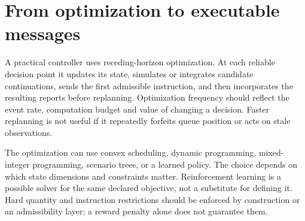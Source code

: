 \documentclass[11pt]{article}
\numberwithin{equation}{section}
\theoremstyle{definition}
\theoremstyle{remark}
\theoremstyle{definition}
\begin{document}
\section{From optimization to executable messages}\label{sec:algorithm}

A practical controller uses receding-horizon optimization. At each reliable
decision point it updates its state, simulates or integrates candidate
continuations, sends the first admissible instruction, and then incorporates
the resulting reports before replanning. Optimization frequency should reflect
the event rate, computation budget and value of changing a decision. Faster
replanning is not useful if it repeatedly forfeits queue position or acts on
stale observations.

\begin{center}
\end{center}

The optimization can use convex scheduling, dynamic programming, mixed-integer
programming, scenario trees, or a learned policy. The choice depends on which
state dimensions and constraints matter. Reinforcement learning is a possible
solver for the same declared objective, not a substitute for defining it.
Hard quantity and instruction restrictions should be enforced by construction
or an admissibility layer; a reward penalty alone does not guarantee them.
\end{document}
